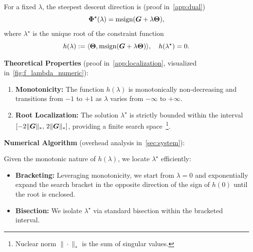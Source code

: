\begin{mdframed}[style=MyBoxStyle2, frametitle={Solution: Tangent Space Update via $\lambda$-Search}]
    For a fixed $\lambda$, the steepest descent direction is (proof in~\cref{app:dual})
    \begin{equation}
        \label{eq:optimal_phi}
        {\bm{\Phi}}^\star(\lambda) = \operatorname{msign}({\bm{G}} + \lambda {\bm{\Theta}}),
    \end{equation}
    where $\lambda^\star$ is the unique root of the constraint function
    \begin{equation}
        h(\lambda) := \langle {\bm{\Theta}}, \operatorname{msign}({\bm{G}} + \lambda {\bm{\Theta}}) \rangle, \quad h(\lambda^\star) = 0.
    \end{equation}

    \textbf{Theoretical Properties} (proof in~\cref{app:localization}, visualized in~\cref{fig:f_lambda_numeric}):
    \begin{enumerate}[label=\roman*), leftmargin=1.5em, itemsep=2pt, topsep=2pt]
        \item \textbf{Monotonicity:} The function $h(\lambda)$ is monotonically non-decreasing and transitions from $-1$ to $+1$ as $\lambda$ varies from $-\infty$ to $+\infty$.
        \item \textbf{Root Localization:} The solution $\lambda^\star$ is strictly bounded within the interval $[-2\|{\bm{G}}\|_*,\, 2\|{\bm{G}}\|_*]$, providing a finite search space~\footnote{Nuclear norm $\|\!\cdot\!\|_*$ is the sum of singular values.}.
    \end{enumerate}

    \vspace{4pt}
    \textbf{Numerical Algorithm} (overhead analysis in~\cref{sec:system}):

    Given the monotonic nature of $h(\lambda)$, we locate $\lambda^\star$ efficiently:
    \begin{itemize}[leftmargin=1.5em, label=$\triangleright$, itemsep=2pt, topsep=2pt]
        \item \textbf{Bracketing:} Leveraging monotonicity, we start from $\lambda = 0$ and exponentially expand the search bracket in the opposite direction of the sign of $h(0)$ until the root is enclosed.
        \item \textbf{Bisection:} We isolate $\lambda^\star$ via standard bisection within the bracketed interval.
    \end{itemize}
\end{mdframed}
